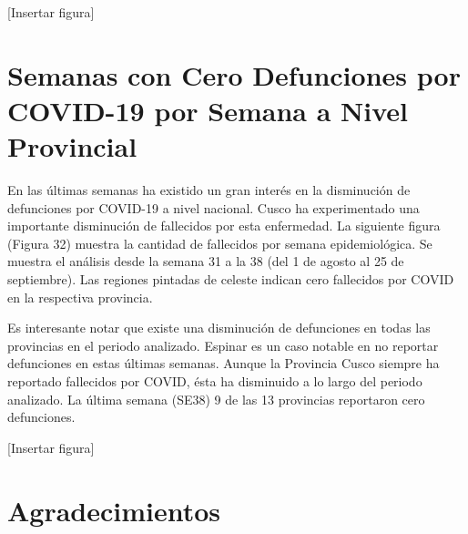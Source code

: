 \documentclass[12pt,a4paper,openany]{book}
\begin{document}
	[Insertar figura]
	
	\chapter*{Semanas con Cero Defunciones por COVID-19 por Semana a Nivel Provincial}
	\noindent En las últimas semanas ha existido un gran interés en la disminución de defunciones por COVID-19 a nivel nacional. Cusco ha experimentado una importante disminución de fallecidos por esta enfermedad.  La siguiente figura (Figura 32) muestra la cantidad de fallecidos por semana epidemiológica. Se muestra el análisis desde la semana 31 a la 38 (del 1 de agosto al 25 de septiembre). Las regiones pintadas de celeste indican cero fallecidos por COVID en la respectiva provincia.
	
	Es interesante notar que existe una disminución de defunciones en todas las provincias en el periodo analizado. Espinar es un caso notable en no reportar defunciones en estas últimas semanas. Aunque la Provincia Cusco siempre ha reportado fallecidos por COVID, ésta ha disminuido a lo largo del periodo analizado. La última semana (SE38) 9 de las 13 provincias reportaron cero defunciones.
	
	[Insertar figura]


	\chapter*{Agradecimientos}
		
\end{document}
